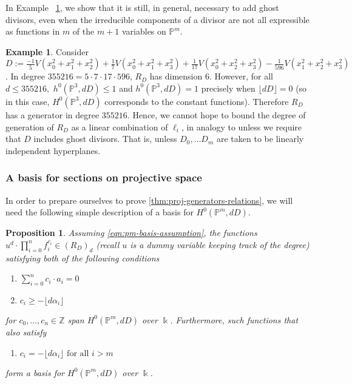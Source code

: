 \documentclass{amsart}
\theoremstyle{plain}
\newtheorem{prop}[thm]{Proposition}
\theoremstyle{definition}
\newtheorem{example}[thm]{Example}
\theoremstyle{remark}
\numberwithin{equation}{section}
\newcommand\sssec{\subsubsection}
\newcommand\bp{{\mathbb P}}
\newcommand\bz{{\mathbb Z}}
\newcommand\bk{{\Bbbk}}
\newcommand\bida{a}
\begin{document}
In Example ~\ref{eg:radical}, we show that it is still, in general,
necessary to add ghost divisors, even when the irreducible components
of a divisor are not all
expressible as functions in $m$ of the $m+1$ variables on $\bp^m$.

\begin{example}
\label{eg:radical}
Consider $D :=\frac{-1}{5}V(x_0^2 + x_1^2 + x_2^2) + \frac{1}{7}V(x_0^2 + x_1^2 +
x_3^2) + \frac{1}{17}V(x_0^2 + x_2^2 + x_3^2) - \frac{1}{596}V(x_1^2 + x_2^2 +
x_3^2)$. In degree $355216 = 5 \cdot 7 \cdot 17 \cdot 596$, $R_D$ has dimension
$6$.
However, for all $d \leq 355216,$ $h^0(\bp^3, dD) \leq 1$
and 
$h^0(\bp^3, dD)  = 1$ precisely when $\lfloor d D \rfloor = 0$ 
(so in this case, $H^0(\bp^3, d D)$ corresponds to the constant functions).
Therefore $R_D$ has a generator in degree $355216$.
Hence, we cannot hope to bound the degree
of generation of $R_D$ as a linear combination of $\ell_i$,
in analogy to \cite[Theorem 8]{dorney:canonical}
unless we require that $D$ includes ghost divisors. That is, unless
$D_0,\ldots D_m$ are taken to be linearly independent hyperplanes.
\end{example}

\sssec*{A basis for sections on projective space}
\label{sssec:basis-projective}

In order to prepare ourselves to prove \autoref{thm:proj-generators-relations},
we will need the following simple description of
a basis for $H^0(\bp^m, dD)$.

\begin{prop}
\label{prop:pm-span-and-basis}
Assuming \autoref{eqn:pm-basis-assumption},
the functions $u^d \cdot \prod_{i=0}^n f_i^{c_i} \in (R_D)_d$ \rm{(}recall $u$ is a dummy variable keeping
track of the degree\rm{)}
satisfying
both of the following conditions

\begin{enumerate}
	\item $\sum_{i=0}^{n} c_i \cdot \bida_i = 0$
	\item $c_i \geq - \lfloor d \alpha_i \rfloor$
\end{enumerate}

\noindent
for $c_0, \ldots, c_n \in \bz$
span $H^0(\bp^m, dD)$ over $\bk$. Furthermore, such functions 
that also satisfy
\begin{enumerate}[resume]
	\item $c_i = -\lfloor d\alpha_i \rfloor \text{ for all } i > m$
\end{enumerate}

\noindent
form a basis for $H^0(\bp^m, dD)$ over $\bk$.
\end{prop}
\end{document}
